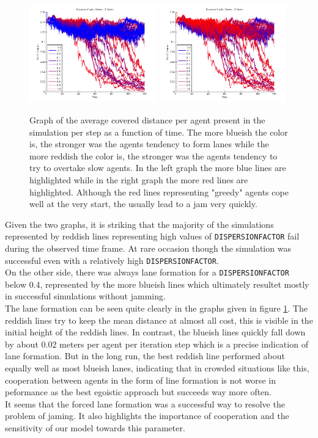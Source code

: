 \begin{figure}[h!]
	\centering
		\includegraphics[width=0.49\textwidth]{pictures/AAllInOneColorsBlue.png}
		\includegraphics[width=0.49\textwidth]{pictures/AAllInOneColorsRed.png}
	\caption{Graph of the average covered distance per agent present in the simulation per step as a function of time. The more blueish the color is, the stronger was the agents tendency to form lanes while the more reddish the color is, the stronger was the agents tendency to try to overtake slow agents. In the left graph the more blue lines are highlighted while in the right graph the more red lines are highlighted. Although the red lines representing "greedy" agents cope well at the very start, the usually lead to a jam very quickly.}
	\label{fig:AAllInOne}
\end{figure}

\noi Given the two graphs, it is striking that the majority of the simulations represented by reddish lines representing high values of \texttt{DISPERSIONFACTOR} fail during the observed time frame. At rare occasion though the simulation was successful even with a relatively high \texttt{DISPERSIONFACTOR}.\\
On the other side, there was always lane formation for a \texttt{DISPERSIONFACTOR} below 0.4, represented by the more blueish lines which ultimately resultet mostly in successful simulations without jamming.\\
The lane formation can be seen quite clearly in the graphs given in figure \ref{fig:AAllInOne}. The reddish lines try to keep the mean distance at almost all cost, this is visible in the initial height of the reddish lines. In contrast, the blueish lines quickly fall down by about 0.02 meters per agent per iteration step which is a precise indication of lane formation. But in the long run, the best reddish line performed about equally well as most blueish lanes, indicating that in crowded situations like this, cooperation between agents in the form of line formation is not worse in peformance as the best egoistic approach but succeeds way more often.\\

\noi It seems that the forced lane formation was a successful way to resolve the problem of jaming. It also highlights the importance of cooperation and the sensitivity of our model towards this parameter.

